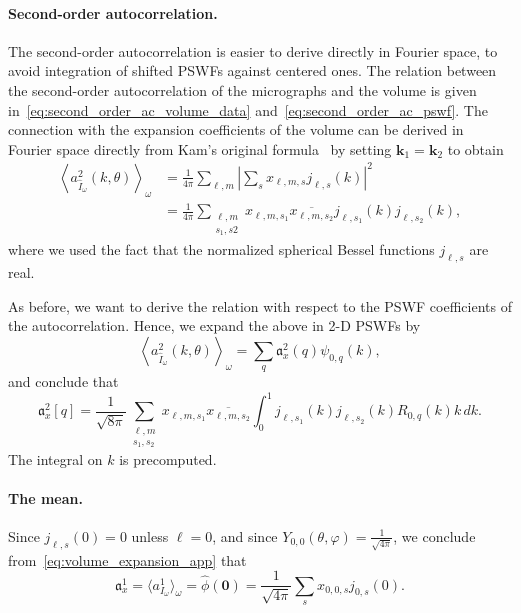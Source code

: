 \documentclass[12pt]{article}
\newcommand{\1}{\mathbf{1}}
\newcommand{\mb}{\mathbf}
\newcommand{\tamir}{x}
\theoremstyle{plain}
\theoremstyle{definition}
\theoremstyle{remark}
\theoremstyle{plain}
\theoremstyle{remark}
\theoremstyle{plain}
\theoremstyle{plain}
\begin{document}
\paragraph{Second-order autocorrelation.}
The second-order autocorrelation is easier to derive directly in Fourier space, to avoid integration of shifted PSWFs against centered ones. 
The relation between the second-order autocorrelation of the micrographs and the volume is given in~\eqref{eq:second_order_ac_volume_data} and~\eqref{eq:second_order_ac_pswf}. 
The connection with the expansion coefficients of the volume can be derived in  Fourier space directly from Kam's
original formula~\cite{kam1980reconstruction} by setting $\mb k_1 = \mb k_2$ to
obtain
\begin{align*}
\left\langle a^2_{\hat{I}_{\omega}}(k,\theta)\right\rangle_{\omega} &=
\frac{1}{4\pi}\sum_{\ell,
	m}\left|\sum_s\tamir_{\ell,m,s}j_{\ell,s}(k)\right|^2 \\&=
\frac{1}{4\pi}\sum_{\substack{\ell,m\\s_1,s2}}\tamir_{\ell,m,s_1}\overline{\tamir_{\ell,m,s_2}}j_{\ell,s_1}(k)j_{\ell,s_2}(k),
\end{align*}
where we used the fact that the normalized spherical Bessel functions
$j_{\ell,s}$ are real. 

As before, we want to derive the relation with respect to the PSWF coefficients of the autocorrelation. Hence,  we expand the above in 2-D PSWFs by
\[\left\langle a^2_{\hat{I}_{\omega}}(k,\theta)\right\rangle_{\omega} =
\sum_{q}\mathfrak{a}_x^2(q)\psi_{0,q}(k),\]
and conclude that 
\begin{equation} \label{eq:ac_2_prolates}
\mathfrak{a}_x^2[q] =
\frac{1}{\sqrt{8\pi}}\sum_{\substack{\ell,m\\s_1,s_2}}\tamir_{\ell,m,s_1}\overline{\tamir_{\ell,m,s_2}}
\int_0^1j_{\ell,s_1}(k)j_{\ell,s_2}(k)R_{0,q}(k)k\, dk.
\end{equation}
The integral on $k$ is precomputed. 

\paragraph{The mean.}

Since $j_{\ell,s}(0) = 0$ unless $\ell=0$, and since
$Y_{0,0}(\theta,\varphi) = \frac{1}{\sqrt{4\pi}}$, we conclude from~\eqref{eq:volume_expansion_app} that
\begin{equation} \label{eq:ac_1_prolates}
\mathfrak{a}_x^1 = \langle
a^1_{I_{\omega}}\rangle_{\omega}  = \widehat  \phi(\mb 0) = \frac{1}{\sqrt{4\pi}}\sum_s\tamir_{0,0,s}j_{0,s}(0).
\end{equation}
\end{document}

